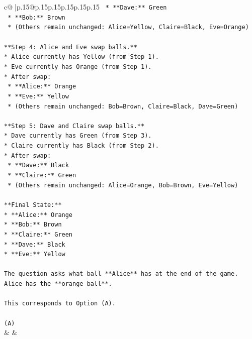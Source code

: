 \documentclass{article}
\begin{document}
{\begin{supertabular}{c@{$\;$}|p{.15\linewidth}@{}p{.15\linewidth}p{.15\linewidth}p{.15\linewidth}p{.15\linewidth}p{.15\linewidth}}
{{{\texttt{    *   **Dave:** Green} \\
\texttt{    *   **Bob:** Brown} \\
\texttt{    *   (Others remain unchanged: Alice=Yellow, Claire=Black, Eve=Orange)} \\
\\ 
\texttt{**Step 4: Alice and Eve swap balls.**} \\
\texttt{*   Alice currently has Yellow (from Step 1).} \\
\texttt{*   Eve currently has Orange (from Step 1).} \\
\texttt{*   After swap:} \\
\texttt{    *   **Alice:** Orange} \\
\texttt{    *   **Eve:** Yellow} \\
\texttt{    *   (Others remain unchanged: Bob=Brown, Claire=Black, Dave=Green)} \\
\\ 
\texttt{**Step 5: Dave and Claire swap balls.**} \\
\texttt{*   Dave currently has Green (from Step 3).} \\
\texttt{*   Claire currently has Black (from Step 2).} \\
\texttt{*   After swap:} \\
\texttt{    *   **Dave:** Black} \\
\texttt{    *   **Claire:** Green} \\
\texttt{    *   (Others remain unchanged: Alice=Orange, Bob=Brown, Eve=Yellow)} \\
\\ 
\texttt{**Final State:**} \\
\texttt{*   **Alice:** Orange} \\
\texttt{*   **Bob:** Brown} \\
\texttt{*   **Claire:** Green} \\
\texttt{*   **Dave:** Black} \\
\texttt{*   **Eve:** Yellow} \\
\\ 
\texttt{The question asks what ball **Alice** has at the end of the game.} \\
\texttt{Alice has the **orange ball**.} \\
\\ 
\texttt{This corresponds to Option (A).} \\
\\ 
\texttt{(A)} \\
            }
        }
    }
    & & \\ \\


\end{supertabular}}
\end{document}
